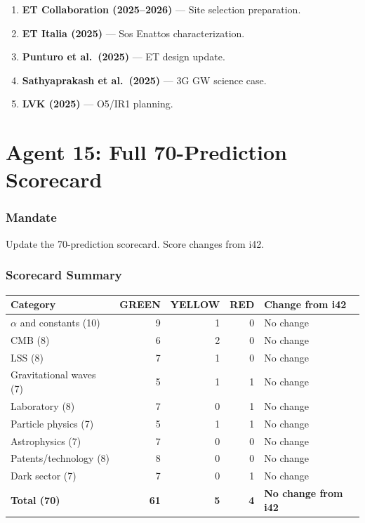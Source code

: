 \documentclass[11pt,a4paper]{article}
\newcommand{\GREEN}{\textcolor{dfdgreen}{\textbf{GREEN}}}
\newcommand{\YELLOW}{\textcolor{dfdyellow}{\textbf{YELLOW}}}
\newcommand{\RED}{\textcolor{dfdred}{\textbf{RED}}}
\begin{document}
\begin{enumerate}
\item \textbf{ET Collaboration (2025--2026)} --- Site selection preparation.
\item \textbf{ET Italia (2025)} --- Sos Enattos characterization.
\item \textbf{Punturo et al.\ (2025)} --- ET design update.
\item \textbf{Sathyaprakash et al.\ (2025)} --- 3G GW science case.
\item \textbf{LVK (2025)} --- O5/IR1 planning.
\end{enumerate}


\part{Agent 15: Full 70-Prediction Scorecard}
\label{part:agent15}

\section{Mandate}

Update the 70-prediction scorecard. Score changes from i42.

\section{Scorecard Summary}

\begin{center}
\begin{tabular}{lrrrl}
\toprule
\textbf{Category} & \textbf{\GREEN} & \textbf{\YELLOW} & \textbf{\RED} & \textbf{Change from i42} \\
\midrule
$\alpha$ and constants (10) & 9 & 1 & 0 & No change \\
CMB (8) & 6 & 2 & 0 & No change \\
LSS (8) & 7 & 1 & 0 & No change \\
Gravitational waves (7) & 5 & 1 & 1 & No change \\
Laboratory (8) & 7 & 0 & 1 & No change \\
Particle physics (7) & 5 & 1 & 1 & No change \\
Astrophysics (7) & 7 & 0 & 0 & No change \\
Patents/technology (8) & 8 & 0 & 0 & No change \\
Dark sector (7) & 7 & 0 & 1 & No change \\
\midrule
\textbf{Total (70)} & \textbf{61} & \textbf{5} & \textbf{4} & \textbf{No change from i42} \\
\bottomrule
\end{tabular}
\end{center}
\end{document}
